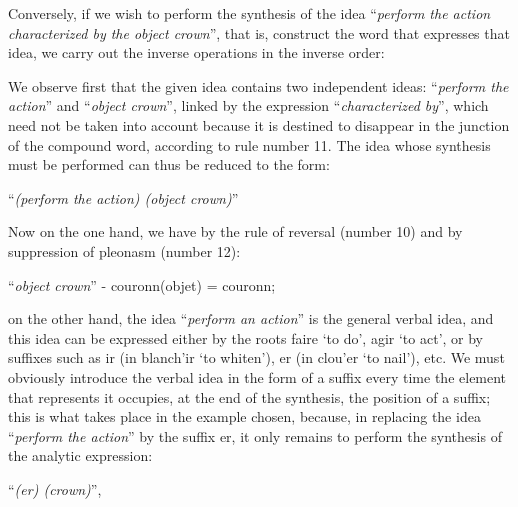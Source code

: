 {{      }

      Conversely, if we wish to perform the synthesis of the idea
      ``\emph{perform the action characterized by the object crown}'',
      that is, construct the word that expresses that idea, we carry
      out the inverse operations in the inverse order:

      We observe first that the given idea contains two independent
      ideas: ``\emph{perform the action}'' and ``\emph{object
        crown}'', linked by the expression ``\emph{characterized
        by}'', which need not be taken into account because it is
      destined to disappear in the junction of the compound word,
      according to rule number 11. The idea whose synthesis must be
      performed can thus be reduced to the form:

      {\centering ``\emph{(perform the action) (object crown)}''\\[0.5ex]

      }

      Now on the one hand, we have by the rule of reversal (number 10)
      and by suppression of pleonasm (number 12):

      {\centering ``\emph{object crown}'' - \textup{couronn(objet)} =
        \textup{couronn};\\[0.5ex]

      }

      \noindent on the other hand, the idea ``\emph{perform an
        action}'' is the general verbal idea, and this idea can be
      expressed either by the roots \textup{faire} `to do',
      \textup{agir} `to act', or by suffixes such as \textup{ir} (in
      \textup{blanch'ir} `to whiten'), \textup{er} (in
      \textup{clou'er} `to nail'), etc.  We must obviously introduce
      the verbal idea in the form of a suffix every time the element
      that represents it occupies, at the end of the synthesis, the
      position of a suffix; this is what takes place in the example
      chosen, because, in replacing the idea ``\emph{perform the
        action}'' by the suffix \textup{er}, it only remains to
      perform the synthesis of the analytic expression:

      {\centering ``\emph{(er) (crown)}'',

        }

  }

